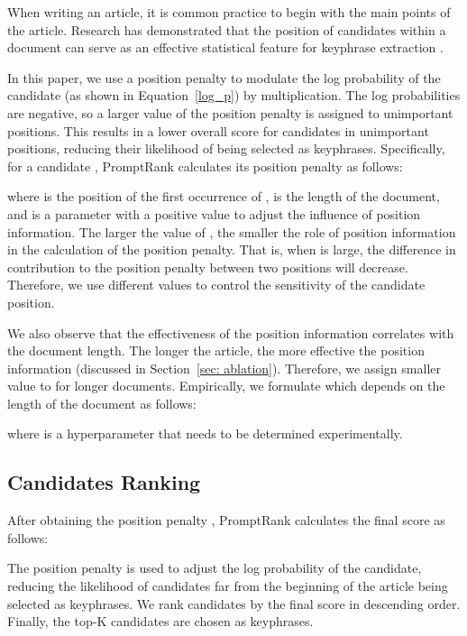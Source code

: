 \documentclass[11pt]{article}
\begin{document}
When writing an article, it is common practice to begin with the main points of the article.
Research has demonstrated that the position of candidates within a document can serve as an effective statistical feature for keyphrase extraction \cite{florescu-caragea-2017-positionrank, bennani-smires-etal-2018-simple, 8954611}. 

In this paper, we use a position penalty to modulate the log probability of the candidate (as shown in Equation~\ref{log_p}) by multiplication. The log probabilities are negative, so a larger value of the position penalty is assigned to unimportant positions. This results in a lower overall score for candidates in unimportant positions, reducing their likelihood of being selected as keyphrases. Specifically, for a candidate , PromptRank calculates its position penalty as follows:
 
where  is the position of the first occurrence of ,  is the length of the document, and  is a parameter with a positive value to adjust the influence of position information. The larger the value of , the smaller the role of position information in the calculation of the position penalty. That is, when  is large, the difference in contribution to the position penalty  between two positions will decrease. Therefore, we use different  values to control the sensitivity of the candidate position. 

We also observe that the effectiveness of the position information correlates with the document length. The longer the article, the more effective the position information (discussed in Section~\ref{sec: ablation}). Therefore, we assign smaller value to  for longer documents. Empirically, we formulate  which depends on the length of the document as follows: 

where  is a hyperparameter that needs to be determined experimentally. 



\subsection{Candidates Ranking}
After obtaining the position penalty ,  PromptRank calculates the final score as follows:

The position penalty is used to adjust the log probability of the candidate, reducing the likelihood of candidates far from the beginning of the article being selected as keyphrases. We rank candidates by the final score in descending order. Finally, the top-K candidates are chosen as keyphrases. 
\end{document}
